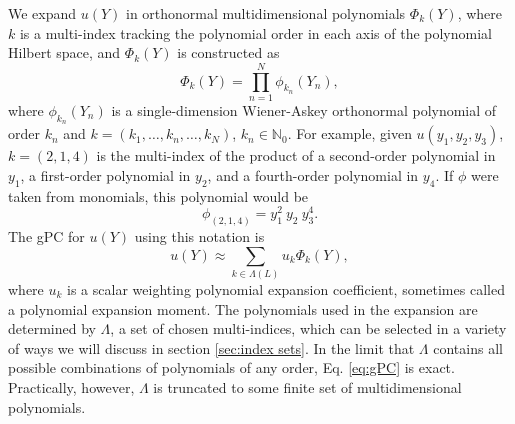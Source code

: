 We expand $u(Y)$ in orthonormal multidimensional polynomials $\Phi_k(Y)$, where $k$ is a multi-index tracking
the polynomial order in each axis of the polynomial Hilbert space, and $\Phi_k(Y)$ is constructed as
\begin{equation}
  \Phi_k(Y) = \prod_{n=1}^N \phi_{k_n}(Y_n),
\end{equation}
where $\phi_{k_n}(Y_n)$ is a single-dimension Wiener-Askey orthonormal polynomial of order $k_n$ and
$k=(k_1,\ldots,k_n,\ldots,k_N)$, $k_n\in\mathbb{N}_0$.  For example, given $u(y_1,y_2,y_3)$, $k=(2,1,4)$
is the multi-index of the
product of a second-order polynomial in $y_1$, a first-order polynomial in $y_2$, and a fourth-order
polynomial in $y_4$. If $\phi$ were taken from monomials, this polynomial would be
\begin{equation}
  \phi_{(2,1,4)} = y_1^2\ y_2\ y_3^4.
\end{equation}
The gPC for $u(Y)$ using this notation is
\begin{equation}\label{eq:gPC}
  u(Y) \approx \sum_{k\in\Lambda(L)} u_k\Phi_k(Y),
\end{equation}
where $u_k$ is a scalar weighting polynomial expansion coefficient, sometimes called a polynomial expansion
moment. The polynomials used in the expansion are determined
by $\Lambda$, a set of chosen multi-indices, which can be selected in a variety of ways we will discuss in section
\ref{sec:index sets}.  In the limit
that $\Lambda$ contains all possible combinations of polynomials of any order, Eq. \ref{eq:gPC} is exact.
Practically, however, $\Lambda$ is truncated to some finite set of multidimensional polynomials.

